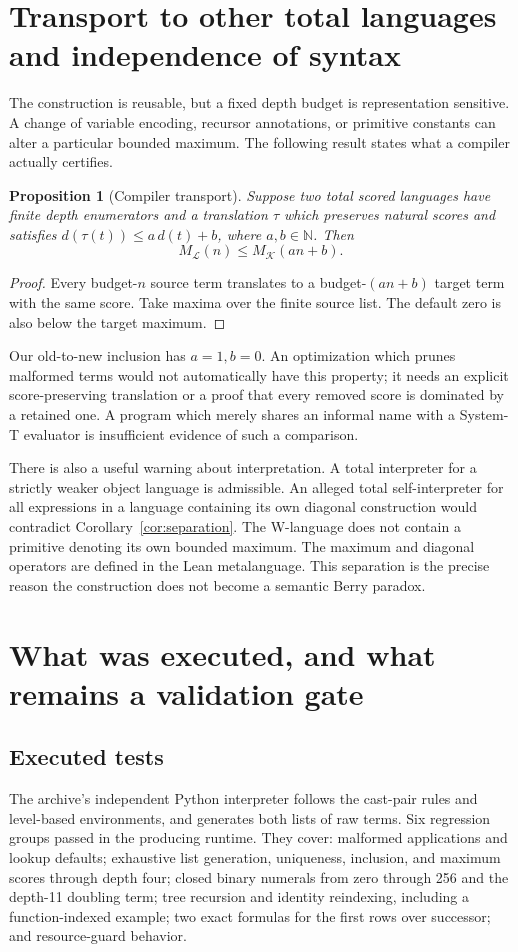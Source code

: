 \documentclass[11pt]{article}
\newtheorem{proposition}[theorem]{Proposition}
\theoremstyle{definition}
\newcommand{\N}{\mathbb N}
\begin{document}
\section{Transport to other total languages and independence of syntax}
The construction is reusable, but a fixed depth budget is representation
sensitive. A change of variable encoding, recursor annotations, or primitive
constants can alter a particular bounded maximum. The following result states
what a compiler actually certifies.

\begin{proposition}[Compiler transport]\label{prop:transport}
Suppose two total scored languages have finite depth enumerators and a
translation $\tau$ which preserves natural scores and satisfies
$d(\tau(t))\le a\,d(t)+b$, where $a,b\in\N$. Then
\[
                   M_{\mathcal L}(n)\le M_{\mathcal K}(an+b).
\]
\end{proposition}
\begin{proof}
Every budget-$n$ source term translates to a budget-$(an+b)$ target term with
the same score. Take maxima over the finite source list. The default zero is
also below the target maximum.
\end{proof}
Our old-to-new inclusion has $a=1,b=0$. An optimization which prunes malformed
terms would not automatically have this property; it needs an explicit
score-preserving translation or a proof that every removed score is dominated
by a retained one. A program which merely shares an informal name with a
System-T evaluator is insufficient evidence of such a comparison.

There is also a useful warning about interpretation. A total interpreter for a
strictly weaker object language is admissible. An alleged total self-interpreter
for all expressions in a language containing its own diagonal construction
would contradict Corollary~\ref{cor:separation}. The W-language does not contain
a primitive denoting its own bounded maximum. The maximum and diagonal operators
are defined in the Lean metalanguage. This separation is the precise reason the
construction does not become a semantic Berry paradox.

\section{What was executed, and what remains a validation gate}
\label{sec:validation}
\subsection{Executed tests}
The archive's independent Python interpreter follows the cast-pair rules and
level-based environments, and generates both lists of raw terms. Six regression
groups passed in the producing runtime. They cover: malformed applications and
lookup defaults; exhaustive list generation, uniqueness, inclusion, and maximum
scores through depth four; closed binary numerals from zero through 256 and
the depth-11 doubling term; tree recursion and identity reindexing, including a
function-indexed example; two exact formulas for the first rows over successor;
and resource-guard behavior.
\end{document}
